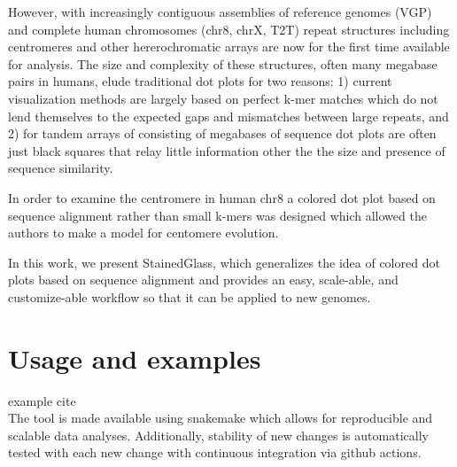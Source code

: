 \documentclass{bioinfo}
\begin{document}
However, with increasingly contiguous assemblies of reference genomes (VGP) and complete human chromosomes (chr8, chrX, T2T) repeat structures including centromeres and other hererochromatic arrays are now for the first time available for analysis. The size and complexity of these structures, often many megabase pairs in humans, elude traditional dot plots for two reasons: 1) current visualization methods are largely based on perfect k-mer matches which do not lend themselves to the expected gaps and mismatches between large repeats, and 2) for tandem arrays of consisting of megabases of sequence dot plots are often just black squares that relay little information other the the size and presence of sequence similarity. 

In order to examine the centromere in human chr8 a colored dot plot based on sequence alignment rather than small k-mers was designed which allowed the authors to make a model for centomere evolution.  

In this work, we present StainedGlass, which generalizes the idea of colored dot plots based on sequence alignment and provides an easy, scale-able, and customize-able workflow so that it can be applied to new genomes. 

\section{Usage and examples}
\citealp{Boffelli03} example cite
\\
The tool is made available using snakemake which allows for reproducible and scalable data analyses.
Additionally, stability of new changes is automatically tested with each new change with continuous integration via github actions.


\end{document}
